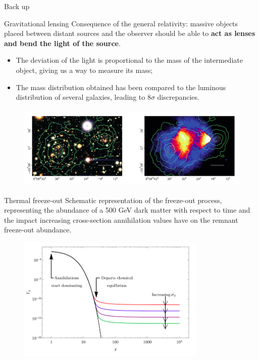 \documentclass[8pt]{beamer}
\newcommand{\backupbegin}{
   \newcounter{finalframe}
   \setcounter{finalframe}{\value{framenumber}}
}
\begin{document}
\backupbegin

\begin{frame}[standout]
Back up
\end{frame}

\begin{frame}{Gravitational lensing}
\justifying
\vspace{5pt}
Consequence of the \alert{general relativity}: massive objects placed between distant sources and the observer should be able to \textbf{act as lenses and bend the light of the source}. \vfill

\begin{itemize}
\justifying
\item The deviation of the light is proportional to the mass of the intermediate object, giving us a way to measure its mass;
\item The mass distribution obtained has been compared to the luminous distribution of several galaxies, leading to $8\sigma$ discrepancies. %
\end{itemize} \vfill

\vspace{-5pt}
\begin{figure}[htbp]
\begin{center}
\includegraphics[width=11	cm, height=4cm]{figs/BulletCluster.png}
\end{center}
\end{figure} \vfill
\end{frame}

\begin{frame}{Thermal freeze-out}
\justifying
\vspace{5pt}
Schematic representation of the \alert{freeze-out process}, representing the abundance of a
500 GeV dark matter with respect to time and the impact increasing cross-section annihilation values have on the remnant freeze-out abundance. \vfill

\begin{figure}[htbp]
\begin{center}
\includegraphics[width=9cm, height=6cm]{figs/FreezeOut.png}
\end{center}
\end{figure} \vfill
\end{frame}
\end{document}

